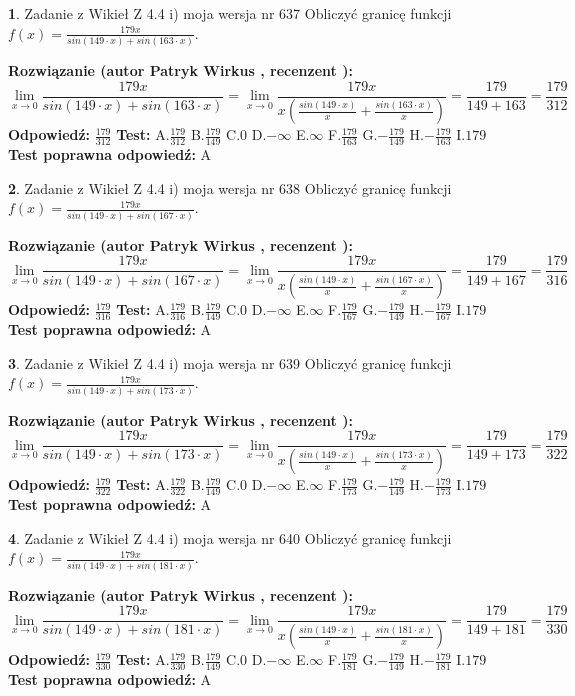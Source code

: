 \documentclass[12pt, a4paper]{article}
\theoremstyle{definition} %
\newtheorem{zad}{}
\newcommand{\zadStart}[1]{\begin{zad}#1\newline}
\newcommand{\zadStop}{\end{zad}}
\newcommand{\rozwStart}[2]{\noindent \textbf{Rozwiązanie (autor #1 , recenzent #2): }\newline}
\newcommand{\rozwStop}{\newline}
\newcommand{\odpStart}{\noindent \textbf{Odpowiedź:}\newline}
\newcommand{\odpStop}{\newline}
\newcommand{\testStart}{\noindent \textbf{Test:}\newline}
\newcommand{\testStop}{\newline}
\newcommand{\kluczStart}{\noindent \textbf{Test poprawna odpowiedź:}\newline}
\newcommand{\kluczStop}{\newline}
\begin{document}
\zadStart{Zadanie z Wikieł Z 4.4 i) moja wersja nr 637}
Obliczyć granicę funkcji $f(x)=\frac{179x}{sin(149\cdot x) +sin(163\cdot x)}$.
\zadStop
\rozwStart{Patryk Wirkus}{}
$$\lim\limits_{x\to 0}\frac{179x}{sin(149\cdot x) +sin(163\cdot x)}=\lim\limits_{x\to 0}\frac{179x}{x(\frac{sin(149\cdot x)}{x}+\frac{sin(163\cdot x)}{x})}=\frac{179}{149+163} = \frac{179}{312}$$
\rozwStop
\odpStart
$\frac{179}{312}$
\odpStop
\testStart
A.$\frac{179}{312}$
B.$\frac{179}{149}$
C.$0$
D.$-\infty$
E.$\infty$
F.$\frac{179}{163}$
G.$-\frac{179}{149}$
H.$-\frac{179}{163}$
I.$179$
\testStop
\kluczStart
A
\kluczStop



\zadStart{Zadanie z Wikieł Z 4.4 i) moja wersja nr 638}
Obliczyć granicę funkcji $f(x)=\frac{179x}{sin(149\cdot x) +sin(167\cdot x)}$.
\zadStop
\rozwStart{Patryk Wirkus}{}
$$\lim\limits_{x\to 0}\frac{179x}{sin(149\cdot x) +sin(167\cdot x)}=\lim\limits_{x\to 0}\frac{179x}{x(\frac{sin(149\cdot x)}{x}+\frac{sin(167\cdot x)}{x})}=\frac{179}{149+167} = \frac{179}{316}$$
\rozwStop
\odpStart
$\frac{179}{316}$
\odpStop
\testStart
A.$\frac{179}{316}$
B.$\frac{179}{149}$
C.$0$
D.$-\infty$
E.$\infty$
F.$\frac{179}{167}$
G.$-\frac{179}{149}$
H.$-\frac{179}{167}$
I.$179$
\testStop
\kluczStart
A
\kluczStop



\zadStart{Zadanie z Wikieł Z 4.4 i) moja wersja nr 639}
Obliczyć granicę funkcji $f(x)=\frac{179x}{sin(149\cdot x) +sin(173\cdot x)}$.
\zadStop
\rozwStart{Patryk Wirkus}{}
$$\lim\limits_{x\to 0}\frac{179x}{sin(149\cdot x) +sin(173\cdot x)}=\lim\limits_{x\to 0}\frac{179x}{x(\frac{sin(149\cdot x)}{x}+\frac{sin(173\cdot x)}{x})}=\frac{179}{149+173} = \frac{179}{322}$$
\rozwStop
\odpStart
$\frac{179}{322}$
\odpStop
\testStart
A.$\frac{179}{322}$
B.$\frac{179}{149}$
C.$0$
D.$-\infty$
E.$\infty$
F.$\frac{179}{173}$
G.$-\frac{179}{149}$
H.$-\frac{179}{173}$
I.$179$
\testStop
\kluczStart
A
\kluczStop



\zadStart{Zadanie z Wikieł Z 4.4 i) moja wersja nr 640}
Obliczyć granicę funkcji $f(x)=\frac{179x}{sin(149\cdot x) +sin(181\cdot x)}$.
\zadStop
\rozwStart{Patryk Wirkus}{}
$$\lim\limits_{x\to 0}\frac{179x}{sin(149\cdot x) +sin(181\cdot x)}=\lim\limits_{x\to 0}\frac{179x}{x(\frac{sin(149\cdot x)}{x}+\frac{sin(181\cdot x)}{x})}=\frac{179}{149+181} = \frac{179}{330}$$
\rozwStop
\odpStart
$\frac{179}{330}$
\odpStop
\testStart
A.$\frac{179}{330}$
B.$\frac{179}{149}$
C.$0$
D.$-\infty$
E.$\infty$
F.$\frac{179}{181}$
G.$-\frac{179}{149}$
H.$-\frac{179}{181}$
I.$179$
\testStop
\kluczStart
A
\kluczStop
\end{document}
